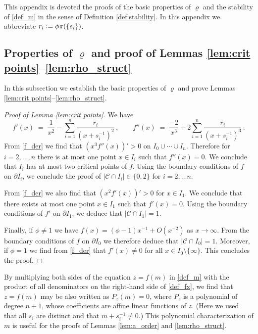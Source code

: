 \documentclass[11pt]{article} %
\numberwithin{equation}{section}
\numberwithin{figure}{section}
\theoremstyle{plain} %
\theoremstyle{definition} %
\renewcommand{\cal}{\mathcal}
\newcommand*{\deq}{\mathrel{\vcenter{\baselineskip0.65ex \lineskiplimit0pt \hbox{.}\hbox{.}}}=}
\newcommand{\abs}[1]{\lvert #1 \rvert}
\begin{document}
This appendix is devoted the proofs of the basic properties of $\varrho$ and the stability of \eqref{def_m} in the sense of Definition \ref{def:stability}. In this appendix we abbreviate $r_i \deq \phi \pi(\{s_i\})$.


\subsection{Properties of $\varrho$ and proof of Lemmas \ref{lem:crit points}--\ref{lem:rho_struct}}

In this subsection we establish the basic properties of $\varrho$ and prove Lemmas \ref{lem:crit points}--\ref{lem:rho_struct}.

\begin{proof}[Proof of Lemma \ref{lem:crit points}]
We have
\begin{equation} \label{f_der}
f'(x) \;=\; \frac{1}{x^2} - \sum_{i = 1}^n \frac{r_i}{(x + s_i^{-1})^2}\,, \qquad f''(x) \;=\; \frac{-2}{x^3} + 2 \sum_{i = 1}^n \frac{r_i}{(x + s_i^{-1})^3}\,.
\end{equation}
From \eqref{f_der} we find that $(x^3 f''(x))' > 0$ on $I_0 \cup \cdots \cup I_n$. Therefore for $i = 2, \dots, n$ there is at most one point $x \in I_i$ such that $f''(x) = 0$. We conclude that $I_i$ has at most two critical points of $f$. Using the boundary conditions of $f$ on $\partial I_i$, we conclude the proof of $\abs{\cal C \cap I_i} \in \{0,2\}$ for $i = 2, \dots n$.

From \eqref{f_der} we also find that $(x^2 f'(x))' > 0$ for $x \in I_1$. We conclude that there exists at most one point $x \in I_1$ such that $f'(x) = 0$. Using the boundary conditions of $f'$ on $\partial I_1$, we deduce that $\abs{\cal C \cap I_1} = 1$.

Finally, if $\phi \neq 1$ we have $f(x) = (\phi - 1) x^{-1} + O(x^{-2})$ as $x \to \infty$. From the boundary conditions of $f$ on $\partial I_0$ we therefore deduce that $\abs{\cal C \cap I_0} = 1$. Moreover, if $\phi = 1$ we find from \eqref{f_der} that $f'(x) \neq 0$ for all $x \in I_0 \setminus \{\infty\}$. This concludes the proof.
\end{proof}

By multiplying both sides of the equation $z = f(m)$ in \eqref{def_m} with the product of all denominators on the right-hand side of \eqref{def_fx}, we find that $z = f(m)$ may be also written as $P_z(m) = 0$, where $P_z$ is a polynomial of degree $n+1$, whose coefficients are affine linear functions of $z$. (Here we used that all $s_i$ are distinct and that $m + s_i^{-1} \neq 0$.) This polynomial characterization of $m$ is useful for the proofs of Lemmas \ref{lem:a_order} and \ref{lem:rho_struct}.
\end{document}
